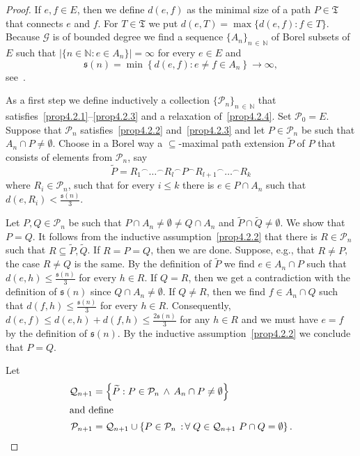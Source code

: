 \documentclass[10pt]{amsart}
\theoremstyle{definition}
\newcommand{\clG}{\mathcal{G}}
\newcommand{\clP}{\mathcal{P}}
\newcommand{\clQ}{\mathcal{Q}}
\newcommand{\bbZ}{\mathbb{N}}
\newcommand{\frkT}{\mathfrak{T}}
\newcommand{\frks}{\mathfrak{s}}
\let\oldforall\forall
\renewcommand*{\forall}{\mathrel{\oldforall}}
\begin{document}
\begin{proof}
If $e,f\in E$, then we define $d(e,f)$ as the minimal size of a path $P\in \frkT$ that connects $e$ and $f$. For $T\in \frkT$ we put $d(e,T)=\max\{d(e,f):f\in T\}$. Because $\clG$ is of bounded degree we find a sequence $\{A_n\}_{n\,\in\,\bbZ}$ of Borel subsets of $E$ such that $|\{n\in \bbZ:e\in A_n\}|=\infty$ for every $e\in E$ and
\[
\frks(n)=\min\left\{d(e,f):e\not =f\in A_n\right\}\to \infty,
\]
see~\cite[Proposition~4.6]{KST}.

As a first step we define inductively a collection $\{\clP_n\}_{n\,\in\,\bbZ}$ that satisfies~\eqref{prop4.2.1}--\eqref{prop4.2.3} and a relaxation of~\eqref{prop4.2.4}. Set $\clP_0=E$. Suppose that $\clP_n$ satisfies~\eqref{prop4.2.2} and~\eqref{prop4.2.3} and let $P\in \clP_n$ be such that $A_n\cap P\not=\emptyset$. Choose in a Borel way a $\subseteq$-maximal path extension $\widetilde{P}$ of $P$ that consists of elements from $\clP_n$, say
\[
\widetilde{P}={R_1}^\frown \dots ^\frown {R_l}^\frown {P} ^\frown {R_{l+1}}^\frown \dots ^\frown {R_k}
\]
where $R_i\in \clP_n$, such that for every $i\le k$ there is $e\in P\cap A_n$ such that $d(e,R_i)<\tfrac{\frks(n)}{3}$.

Let $P,Q\in \clP_n$ be such that $P\cap A_n\not=\emptyset\not=Q\cap A_n$ and $\widetilde{P}\cap \widetilde{Q}\not=\emptyset$. We show that $P=Q$. It follows from the inductive assumption~\eqref{prop4.2.2} that there is $R\in \clP_n$ such that $R\subseteq \widetilde{P},\widetilde{Q}$. If $R=P=Q$, then we are done. Suppose, e.g., that $R\not =P$, the case $R\not=Q$ is the same. By the definition of $\widetilde{P}$ we find $e\in A_n\cap P$ such that $d(e,h)\le \tfrac{\frks(n)}{3}$ for every $h\in R$. If $Q=R$, then we get a contradiction with the definition of $\frks(n)$ since $Q\cap A_n\not=\emptyset$. If $Q\not= R$, then we find $f\in A_n\cap Q$ such that $d(f,h)\le \tfrac{\frks(n)}{3}$ for every $h\in R$. Consequently, $d(e,f)\le d(e,h)+d(f,h)\le \tfrac{2\frks(n)}{3}$ for any $h\in R$ and we must have $e=f$ by the definition of $\frks(n)$. By the inductive assumption~\eqref{prop4.2.2} we conclude that $P=Q$.


Let
\begin{align*}
\clQ_{n+1} &=\left\{\widetilde{P}:P\in \clP_n \, \wedge \, A_n\cap P\not=\emptyset\right\}
\\
\intertext{and define}
\clP_{n+1} &=\clQ_{n+1}\cup \left\{P\in \clP_n\,:\,\forall Q\in \clQ_{n+1} \ P\cap Q=\emptyset\right\}.
\end{align*}


\end{proof}
\end{document}
